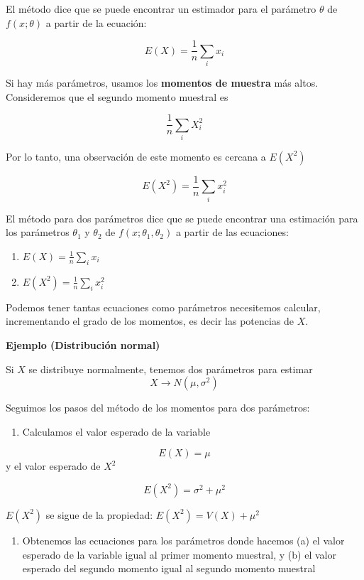 \documentclass[
]{book}
\providecommand{\tightlist}{%
  \setlength{\itemsep}{0pt}\setlength{\parskip}{0pt}}
\begin{document}
El método dice que se puede encontrar un estimador para el parámetro \(\theta\) de \(f(x;\theta)\) a partir de la ecuación:

\[E(X)=\frac{1}{n}\sum_i x_i\]

Si hay más parámetros, usamos los \textbf{momentos de muestra} más altos. Consideremos que el segundo momento muestral es

\[\frac{1}{n}\sum_i X^2_i\]

Por lo tanto, una observación de este momento es cercana a \(E(X^2)\)

\[E(X ^ 2)=\frac{1}{n}\sum_i x^2_i\]

El método para dos parámetros dice que se puede encontrar una estimación para los parámetros \(\theta_1\) y \(\theta_2\) de \(f(x;\theta_1,\theta_2)\) a partir de las ecuaciones:

\begin{enumerate}
\def\labelenumi{\alph{enumi}.}
\item
  \(E(X)= \frac{1}{n}\sum_i x_i\)
\item
  \(E(X^2)=\frac{1}{n}\sum_i x^2_i\)
\end{enumerate}

Podemos tener tantas ecuaciones como parámetros necesitemos calcular, incrementando el grado de los momentos, es decir las potencias de \(X\).

\textbf{Ejemplo (Distribución normal)}

Si \(X\) se distribuye normalmente, tenemos dos parámetros para estimar
\[X \rightarrow N(\mu, \sigma^2)\]

Seguimos los pasos del método de los momentos para dos parámetros:

\begin{enumerate}
\def\labelenumi{\arabic{enumi}.}
\tightlist
\item
  Calculamos el valor esperado de la variable
\end{enumerate}

\[E(X)=\mu\]
y el valor esperado de \(X^2\)

\[E(X^2)=\sigma^2+\mu^2\]

\(E(X^2)\) se sigue de la propiedad: \(E(X^2) = V(X)+\mu^2\)

\begin{enumerate}
\def\labelenumi{\arabic{enumi}.}
\setcounter{enumi}{1}
\tightlist
\item
  Obtenemos las ecuaciones para los parámetros donde hacemos (a) el valor esperado de la variable igual al primer momento muestral, y (b) el valor esperado del segundo momento igual al segundo momento muestral
\end{enumerate}
\end{document}
